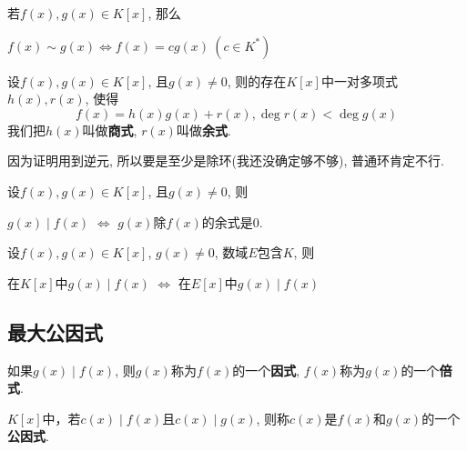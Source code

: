 \begin{Proposition}
若$f(x), g(x) \in K[x]$, 那么
\begin{tightcenter}
$f(x) \sim g(x) \iff f(x) = c g(x)~(c \in K^*)$
\end{tightcenter}
\end{Proposition}

\begin{Theorem}[带余除法]
设$f(x), g(x) \in K[x]$, 且$g(x) \neq 0$, 则\;\;的存在$K[x]$中一对多项式$h(x), r(x)$,
使得
\[
f(x) = h(x) g(x) + r(x), \deg r(x) < \deg g(x)
\]
我们把$h(x)$叫做\textbf{商式},
$r(x)$叫做\textbf{余式}.
\end{Theorem}

\begin{Note}
因为证明用到逆元, 所以要是至少是除环(我还没确定够不够), 普通环肯定不行.
\end{Note}

\begin{Corollary}
设$f(x), g(x) \in K[x]$, 且$g(x) \neq 0$, 则
\begin{tightcenter}
$g(x) \mid f(x)$ $\iff$ $g(x)$除$f(x)$的余式是$0$.
\end{tightcenter}
\end{Corollary}

\begin{Proposition}[!, 整除性不随数域的扩大而改变]
设$f(x), g(x) \in K[x]$, $g(x) \neq 0$, 数域$E$包含$K$, 则
\begin{tightcenter}
在$K[x]$中$g(x) \mid f(x)$ $\iff$ 在$E[x]$中$g(x) \mid f(x)$ 
\end{tightcenter}
\end{Proposition}


\subsection{最大公因式}

\begin{Definition}[因式]
如果$g(x) \mid f(x)$, 则$g(x)$称为$f(x)$的一个\textbf{因式}, $f(x)$称为$g(x)$的一个\textbf{倍式}.
\end{Definition}

\begin{Definition}[公因式]
$K[x]$中，若$c(x) \mid f(x)$且$c(x) \mid g(x)$, 则称$c(x)$是$f(x)$和$g(x)$的一个\textbf{公因式}.
\end{Definition}

